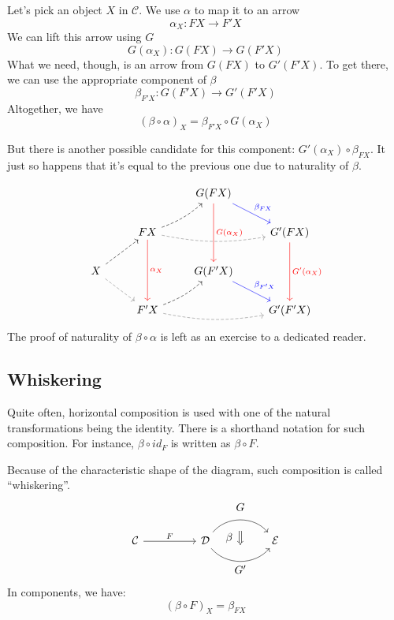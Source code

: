 \documentclass[DaoFP]{subfiles}
\begin{document}
Let's pick an object $X$ in $\mathcal{C}$. We use $\alpha$ to map it to an arrow 
\[ \alpha_X \colon F X \to F' X \]
We can lift this arrow using $G$
\[ G (\alpha_X) \colon G (F X) \to G (F' X) \]
What we need, though, is an arrow from $G (F X)$ to $G' (F' X)$. To get there, we can use the appropriate component of $\beta$
\[ \beta_{F' X} \colon G (F' X) \to G' (F' X) \]
Altogether, we have
\[ (\beta \circ \alpha)_X = \beta_{F' X} \circ G (\alpha_X) \]

But there is another possible candidate for this component: $G'(\alpha_X) \circ \beta_{F X}$. It just so happens that it's equal to the previous one due to naturality of $\beta$. 

\[
 \begin{tikzcd}
  && G(F X)
  \arrow[dd, red, "G(\alpha_X)"]
  \arrow[dr, blue, "\beta_{F X}"]
  \\
  & F X
  \arrow[rr, bend right=10, dashed, gray]
  \arrow[ur, bend right=10, dashed]
  \arrow[dd, red, "\alpha_X"]
 && G' (F X)
  \arrow[dd, red, "G'(\alpha_X)"]
 \\
 X
 \arrow[ur, dashed]
 \arrow[dr, gray, dashed]
 && G(F' X)
  \arrow[dr, blue, "\beta_{F' X}"]
 \\
 &F' X
  \arrow[rr, bend right=10, dashed, gray]
 \arrow[ur, bend right=10, dashed]
 && G'(F' X)
\end{tikzcd}
\]
The proof of naturality of $\beta \circ \alpha$ is left as an exercise to a dedicated reader.

\subsection{Whiskering}

Quite often, horizontal composition is used with one of the natural transformations being the identity. There is a shorthand notation for such composition. For instance, $\beta \circ id_F$ is written as $\beta \circ F$. 

Because of the characteristic shape of the diagram, such composition is called ``whiskering''.
\[
\begin{tikzcd}[column sep=huge]
\mathcal{C}
 \arrow[r, "F"]
 &
\mathcal{D}
  \arrow[bend left=50]{r}[name=U1, label=above:$G$]{}
  \arrow[bend right=50]{r}[name=D1, label=below:$G'$]{} 
 &
\mathcal{E}
  \arrow[shorten <=10pt,shorten >=10pt,Rightarrow,to path={(U1) -- node[label=left:$\beta$] {} (D1)}]{}
\end{tikzcd}
\]
In components, we have:
\[ (\beta \circ F)_X = \beta_{F X} \]
\end{document}
